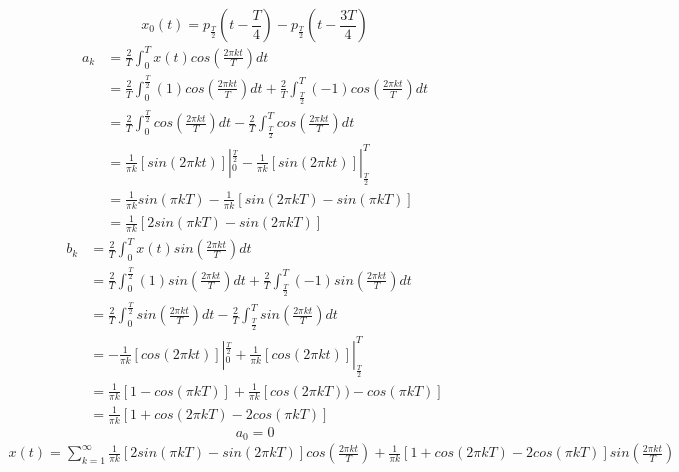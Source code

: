 \documentclass[12pt]{report}
\begin{document}
\begin{equation*}
	x_0(t) = p_{\frac{T}{2}}(t - \frac{T}{4}) - p_{\frac{T}{2}}(t - \frac{3T}{4})
\end{equation*}
\begin{align*}
	a_k &= \frac{2}{T}\int_{0}^{T}x(t)cos(\frac{2\pi kt}{T})dt \\
	&= \frac{2}{T}\int_{0}^{\frac{T}{2}}(1)cos(\frac{2\pi kt}{T})dt + \frac{2}{T}\int_{\frac{T}{2}}^{T}(-1)cos(\frac{2\pi kt}{T})dt \\
	&= \frac{2}{T}\int_{0}^{\frac{T}{2}}cos(\frac{2\pi kt}{T})dt - \frac{2}{T}\int_{\frac{T}{2}}^{T}cos(\frac{2\pi kt}{T})dt \\
	&= \frac{1}{\pi k}[sin(2\pi kt)]|_0^{\frac{T}{2}} - \frac{1}{\pi k}[sin(2\pi kt)]|_{\frac{T}{2}}^{T} \\
	&= \frac{1}{\pi k}sin(\pi kT) - \frac{1}{\pi k}[sin(2\pi kT) - sin(\pi kT)] \\
	&= \frac{1}{\pi k}[2sin(\pi kT) - sin(2\pi kT)]
\end{align*}
\begin{align*}
	b_k &= \frac{2}{T}\int_{0}^{T}x(t)sin(\frac{2\pi kt}{T})dt \\
	&= \frac{2}{T}\int_{0}^{\frac{T}{2}}(1)sin(\frac{2\pi kt}{T})dt + \frac{2}{T}\int_{\frac{T}{2}}^{T}(-1)sin(\frac{2\pi kt}{T})dt \\
	&= \frac{2}{T}\int_{0}^{\frac{T}{2}}sin(\frac{2\pi kt}{T})dt - \frac{2}{T}\int_{\frac{T}{2}}^{T}sin(\frac{2\pi kt}{T})dt \\
	&= -\frac{1}{\pi k}[cos(2\pi kt)]|_0^{\frac{T}{2}} + \frac{1}{\pi k}[cos(2\pi kt)]|_{\frac{T}{2}}^{T} \\
	&= \frac{1}{\pi k}[1 - cos(\pi kT)] + \frac{1}{\pi k}[cos(2\pi kT)) - cos(\pi kT)] \\
	&= \frac{1}{\pi k}[1 + cos(2\pi kT) - 2cos(\pi kT)]
\end{align*}
\begin{equation*}
	a_0 = 0
\end{equation*}
\begin{align*}
	x(t) = \sum_{k=1}^{\infty}\frac{1}{\pi k}[2sin(\pi kT) - sin(2\pi kT)]cos(\frac{2\pi kt}{T}) + \frac{1}{\pi k}[1 + cos(2\pi kT) - 2cos(\pi kT)]sin(\frac{2\pi kt}{T})
\end{align*}
	
\end{document}
